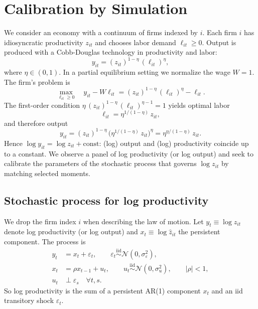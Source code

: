 \section{Calibration by Simulation}


We consider an economy with a continuum of firms indexed by $i$. Each firm $i$ has idiosyncratic productivity $z_{it}$ and chooses labor demand $\ell_{it} \ge 0$. Output is produced with a Cobb-Douglas technology in productivity and labor:
\begin{equation}
  y_{it} = (z_{it})^{1-\eta}\, (\ell_{it})^{\eta},
\end{equation}
where $\eta \in (0,1)$. In a partial equilibrium setting we normalize the wage $W = 1$. The firm's problem is
\begin{equation}
  \max_{\ell_{it} \ge 0} \quad y_{it} - W \ell_{it} = (z_{it})^{1-\eta}\, (\ell_{it})^{\eta} - \ell_{it}.
\end{equation}
The first-order condition $\eta\, (z_{it})^{1-\eta}\, (\ell_{it})^{\eta-1} = 1$ yields optimal labor
\begin{equation}
  \ell_{it} = \eta^{1/(1-\eta)}\, z_{it},
\end{equation}
and therefore output
\begin{equation}
  y_{it} = (z_{it})^{1-\eta}\, \bigl(\eta^{1/(1-\eta)}\, z_{it}\bigr)^{\eta}
  = \eta^{\eta/(1-\eta)}\, z_{it}.
\end{equation}
Hence $\log y_{it} = \log z_{it} + \text{const}$: (log) output and (log) productivity coincide up to a constant. We observe a panel of log productivity (or log output) and seek to calibrate the parameters of the stochastic process that governs $\log z_{it}$ by matching selected moments.

\subsection{Stochastic process for log productivity}

We drop the firm index $i$ when describing the law of motion. Let $y_t \equiv \log z_{it}$ denote log productivity (or log output) and $x_t \equiv \log \hat z_{it}$ the persistent component. The process is
\begin{align*}
  y_t &= x_t + \varepsilon_t, \qquad \varepsilon_t \stackrel{\text{iid}}{\sim} \mathcal{N}(0,\sigma_\varepsilon^2), \\
  x_t &= \rho x_{t-1} + u_t, \qquad u_t \stackrel{\text{iid}}{\sim} \mathcal{N}(0,\sigma_u^2), \qquad |\rho| < 1, \\
  u_t &\perp \varepsilon_s \quad \forall t,s.
\end{align*}
So log productivity is the sum of a persistent AR(1) component $x_t$ and an iid transitory shock $\varepsilon_t$.

